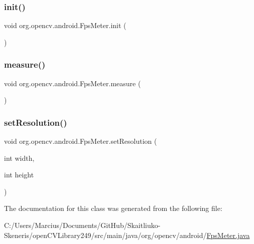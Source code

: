 \mbox{\label{classorg_1_1opencv_1_1android_1_1_fps_meter_ac36e7d25af25ce92e24b29ad0e531491}} 
\subsubsection{\texorpdfstring{init()}{init()}}
{\footnotesize\ttfamily void org.\+opencv.\+android.\+Fps\+Meter.\+init (\begin{DoxyParamCaption}{ }\end{DoxyParamCaption})}

\mbox{\label{classorg_1_1opencv_1_1android_1_1_fps_meter_a842c91516384a129c84dcd5b31b9c768}} 
\subsubsection{\texorpdfstring{measure()}{measure()}}
{\footnotesize\ttfamily void org.\+opencv.\+android.\+Fps\+Meter.\+measure (\begin{DoxyParamCaption}{ }\end{DoxyParamCaption})}

\mbox{\label{classorg_1_1opencv_1_1android_1_1_fps_meter_a8da761141b426ba32050cb98b808adff}} 
\subsubsection{\texorpdfstring{set\+Resolution()}{setResolution()}}
{\footnotesize\ttfamily void org.\+opencv.\+android.\+Fps\+Meter.\+set\+Resolution (\begin{DoxyParamCaption}\item[{int}]{width,  }\item[{int}]{height }\end{DoxyParamCaption})}



The documentation for this class was generated from the following file\+:\begin{DoxyCompactItemize}
\item 
C\+:/\+Users/\+Marcius/\+Documents/\+Git\+Hub/\+Skaitliuko-\/\+Skeneris/open\+C\+V\+Library249/src/main/java/org/opencv/android/\mbox{\hyperlink{_fps_meter_8java}{Fps\+Meter.\+java}}\end{DoxyCompactItemize}
